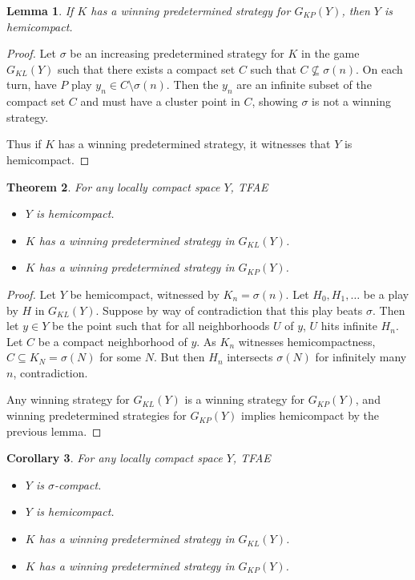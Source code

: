 \documentclass[11pt]{article}
\theoremstyle{plain}
\newtheorem{theorem}{Theorem}
\newtheorem{lemma}[theorem]{Lemma}
\newtheorem{corollary}[theorem]{Corollary}
\theoremstyle{definition}
\theoremstyle{remark}
\begin{document}
\begin{lemma}
If $K$ has a winning predetermined strategy for $G_{KP}(Y)$, then $Y$ is hemicompact.
\end{lemma}

\begin{proof}
Let $\sigma$ be an increasing predetermined strategy for $K$ in the game $G_{KL}(Y)$ such that there exists a compact set $C$ such that $C \not\subseteq \sigma(n)$. On each turn, have $P$ play $y_n\in C \setminus \sigma(n)$. Then the $y_n$ are an infinite subset of the compact set $C$ and must have a cluster point in $C$, showing $\sigma$ is not a winning strategy.

Thus if $K$ has a winning predetermined strategy, it witnesses that $Y$ is hemicompact.
\end{proof}

\begin{theorem}
For any locally compact space $Y$, TFAE
  \begin{itemize}
  \item $Y$ is hemicompact.
  \item $K$ has a winning predetermined strategy in $G_{KL}(Y)$.
  \item $K$ has a winning predetermined strategy in $G_{KP}(Y)$.
  \end{itemize}
\end{theorem}

\begin{proof}
Let $Y$ be hemicompact, witnessed by $K_n=\sigma(n)$. Let $H_0,H_1,\dots$ be a play by $H$ in $G_{KL}(Y)$. Suppose by way of contradiction that this play beats $\sigma$. Then let $y\in Y$ be the point such that for all neighborhoods $U$ of $y$, $U$ hits infinite $H_n$. Let $C$ be a compact neighborhood of $y$. As $K_n$ witnesses hemicompactness, $C \subseteq K_N = \sigma(N)$ for some $N$. But then $H_n$ intersects $\sigma(N)$ for infinitely many $n$, contradiction.

Any winning strategy for $G_{KL}(Y)$ is a winning strategy for $G_{KP}(Y)$, and winning predetermined strategies for $G_{KP}(Y)$ implies hemicompact by the previous lemma.
\end{proof}

\begin{corollary}
For any locally compact space $Y$, TFAE
  \begin{itemize}
  \item $Y$ is $\sigma$-compact.
  \item $Y$ is hemicompact.
  \item $K$ has a winning predetermined strategy in $G_{KL}(Y)$.
  \item $K$ has a winning predetermined strategy in $G_{KP}(Y)$.
  \end{itemize}
\end{corollary}
\end{document}

